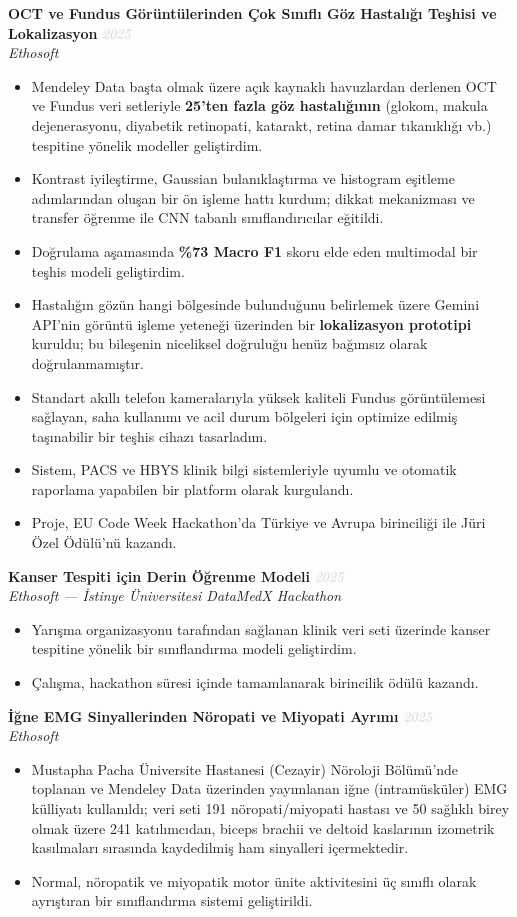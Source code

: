 \documentclass[11pt,a4paper]{article}
\newcommand{\blueitem}[1]{\textcolor{subtitleblue}{\textbf{#1}}}
\newcommand{\daterange}[1]{\hfill \textcolor{lightgray}{\textit{#1}}}
\begin{document}
\blueitem{OCT ve Fundus Görüntülerinden Çok Sınıflı Göz Hastalığı Teşhisi ve Lokalizasyon} \daterange{2025}\\
\textit{Ethosoft}
\begin{itemize}
    \item Mendeley Data başta olmak üzere açık kaynaklı havuzlardan derlenen OCT ve Fundus veri setleriyle \textbf{25'ten fazla göz hastalığının} (glokom, makula dejenerasyonu, diyabetik retinopati, katarakt, retina damar tıkanıklığı vb.) tespitine yönelik modeller geliştirdim.
    \item Kontrast iyileştirme, Gaussian bulanıklaştırma ve histogram eşitleme adımlarından oluşan bir ön işleme hattı kurdum; dikkat mekanizması ve transfer öğrenme ile CNN tabanlı sınıflandırıcılar eğitildi.
    \item Doğrulama aşamasında \textbf{\%73 Macro F1} skoru elde eden multimodal bir teşhis modeli geliştirdim.
    \item Hastalığın gözün hangi bölgesinde bulunduğunu belirlemek üzere Gemini API'nin görüntü işleme yeteneği üzerinden bir \textbf{lokalizasyon prototipi} kuruldu; bu bileşenin niceliksel doğruluğu henüz bağımsız olarak doğrulanmamıştır.
    \item Standart akıllı telefon kameralarıyla yüksek kaliteli Fundus görüntülemesi sağlayan, saha kullanımı ve acil durum bölgeleri için optimize edilmiş taşınabilir bir teşhis cihazı tasarladım.
    \item Sistem, PACS ve HBYS klinik bilgi sistemleriyle uyumlu ve otomatik raporlama yapabilen bir platform olarak kurgulandı.
    \item Proje, EU Code Week Hackathon'da Türkiye ve Avrupa birinciliği ile Jüri Özel Ödülü'nü kazandı.
\end{itemize}

\blueitem{Kanser Tespiti için Derin Öğrenme Modeli} \daterange{2025}\\
\textit{Ethosoft --- İstinye Üniversitesi DataMedX Hackathon}
\begin{itemize}
    \item Yarışma organizasyonu tarafından sağlanan klinik veri seti üzerinde kanser tespitine yönelik bir sınıflandırma modeli geliştirdim.
    \item Çalışma, hackathon süresi içinde tamamlanarak birincilik ödülü kazandı.
\end{itemize}

\blueitem{İğne EMG Sinyallerinden Nöropati ve Miyopati Ayrımı} \daterange{2025}\\
\textit{Ethosoft}
\begin{itemize}
    \item Mustapha Pacha Üniversite Hastanesi (Cezayir) Nöroloji Bölümü'nde toplanan ve Mendeley Data üzerinden yayımlanan iğne (intramüsküler) EMG külliyatı kullanıldı; veri seti 191 nöropati/miyopati hastası ve 50 sağlıklı birey olmak üzere 241 katılımcıdan, biceps brachii ve deltoid kaslarının izometrik kasılmaları sırasında kaydedilmiş ham sinyalleri içermektedir.
    \item Normal, nöropatik ve miyopatik motor ünite aktivitesini üç sınıflı olarak ayrıştıran bir sınıflandırma sistemi geliştirildi.
\end{itemize}
\end{document}
